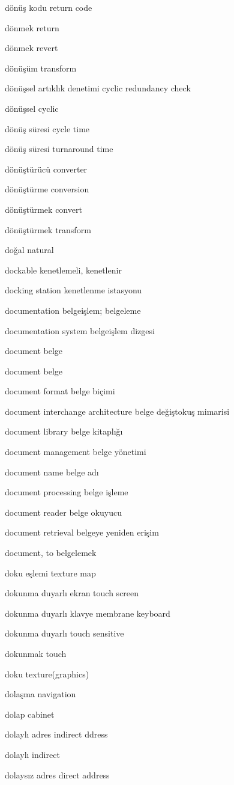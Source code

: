 \documentclass[12pt,fleqn]{article}\usepackage{../../common}
\begin{document}
dönüş kodu return code

dönmek return

dönmek revert

dönüşüm transform

dönüşsel artıklık denetimi cyclic redundancy check

dönüşsel cyclic

dönüş süresi cycle time

dönüş süresi turnaround time

dönüştürücü converter

dönüştürme conversion

dönüştürmek convert

dönüştürmek transform

doğal natural

dockable kenetlemeli, kenetlenir

docking station kenetlenme istasyonu

documentation belgeişlem; belgeleme

documentation system belgeişlem dizgesi

document belge

document belge

document format belge biçimi

document interchange architecture belge değiştokuş mimarisi

document library belge kitaplığı

document management belge yönetimi

document name belge adı

document processing belge işleme

document reader belge okuyucu

document retrieval belgeye yeniden erişim

document, to belgelemek

doku eşlemi texture map

dokunma duyarlı ekran touch screen

dokunma duyarlı klavye membrane keyboard

dokunma duyarlı touch sensitive

dokunmak touch

doku texture(graphics)

dolaşma navigation

dolap cabinet

dolaylı adres indirect ddress

dolaylı indirect

dolaysız adres direct address
\end{document}
